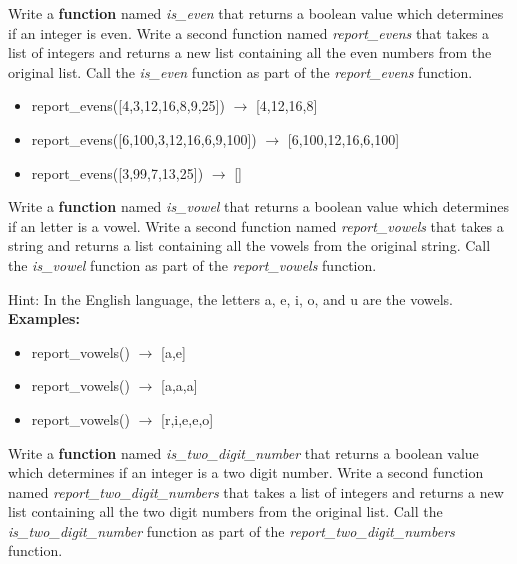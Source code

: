 




	\item 
		Write a \textbf{function} named \textit{is\_even} that returns a boolean value which determines 
		if an integer is even.  Write a second function named \textit{report\_evens} that takes a list 
		of integers and returns a new list containing all the even numbers from the original list. 
		Call the \textit{is\_even} function as part of the \textit{report\_evens} function. 
		
		\begin{itemize}
			\item  report\_evens([4,3,12,16,8,9,25]) $\rightarrow$ [4,12,16,8]
			\item  report\_evens([6,100,3,12,16,6,9,100]) $\rightarrow$ [6,100,12,16,6,100]
			\item  report\_evens([3,99,7,13,25]) $\rightarrow$ []
		\end{itemize}


	\item 
		Write a \textbf{function} named \textit{is\_vowel} that returns a boolean value which determines 
		if an letter is a vowel.  Write a second function named \textit{report\_vowels} that takes a string 
		and returns a list containing all the vowels from the original string.
		Call the \textit{is\_vowel} function as part of the \textit{report\_vowels} function. 

		Hint: In the English language, the letters a, e, i, o, and u are the vowels.\\
		\textbf{Examples:}		
		\begin{itemize}
			\item report\_vowels() $\rightarrow$ [a,e]
			\item report\_vowels() $\rightarrow$ [a,a,a] 
			\item report\_vowels() $\rightarrow$ [r,i,e,e,o]
		\end{itemize}

	

	\item 
		Write a \textbf{function} named \textit{is\_two\_digit\_number} that returns a boolean value 
		which determines if an integer is a two digit number. Write a second function named 
		\textit{report\_two\_digit\_numbers} that takes a list of integers and returns a new list 
		containing all the two digit numbers from the original list. 
		Call the \textit{is\_two\_digit\_number} function as part of the \textit{report\_two\_digit\_numbers} function. 


